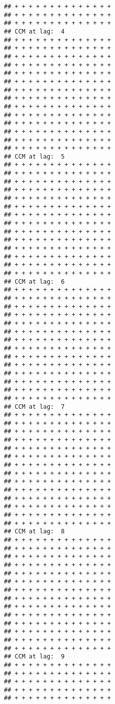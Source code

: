 \documentclass[
]{article}
\begin{document}
\begin{verbatim}
## + + + + + + + + + + + + + + 
## + + + + + + + + + + + + + + 
## + + + + + + + + + + + + + + 
## CCM at lag:  4 
## + + + + + + + + + + + + + + 
## + + + + + + + + + + + + + + 
## + + + + + + + + + + + + + + 
## + + + + + + + + + + + + + + 
## + + + + + + + + + + + + + + 
## + + + + + + + + + + + + + + 
## + + + + + + + + + + + + + + 
## + + + + + + + + + + + + + + 
## + + + + + + + + + + + + + + 
## + + + + + + + + + + + + + + 
## + + + + + + + + + + + + + + 
## + + + + + + + + + + + + + + 
## + + + + + + + + + + + + + + 
## + + + + + + + + + + + + + + 
## CCM at lag:  5 
## + + + + + + + + + + + + + + 
## + + + + + + + + + + + + + + 
## + + + + + + + + + + + + + + 
## + + + + + + + + + + + + + + 
## + + + + + + + + + + + + + + 
## + + + + + + + + + + + + + + 
## + + + + + + + + + + + + + + 
## + + + + + + + + + + + + + + 
## + + + + + + + + + + + + + + 
## + + + + + + + + + + + + + + 
## + + + + + + + + + + + + + + 
## + + + + + + + + + + + + + + 
## + + + + + + + + + + + + + + 
## + + + + + + + + + + + + + + 
## CCM at lag:  6 
## + + + + + + + + + + + + + + 
## + + + + + + + + + + + + + + 
## + + + + + + + + + + + + + + 
## + + + + + + + + + + + + + + 
## + + + + + + + + + + + + + + 
## + + + + + + + + + + + + + + 
## + + + + + + + + + + + + + + 
## + + + + + + + + + + + + + + 
## + + + + + + + + + + + + + + 
## + + + + + + + + + + + + + + 
## + + + + + + + + + + + + + + 
## + + + + + + + + + + + + + + 
## + + + + + + + + + + + + + + 
## + + + + + + + + + + + + + + 
## CCM at lag:  7 
## + + + + + + + + + + + + + + 
## + + + + + + + + + + + + + + 
## + + + + + + + + + + + + + + 
## + + + + + + + + + + + + + + 
## + + + + + + + + + + + + + + 
## + + + + + + + + + + + + + + 
## + + + + + + + + + + + + + + 
## + + + + + + + + + + + + + + 
## + + + + + + + + + + + + + + 
## + + + + + + + + + + + + + + 
## + + + + + + + + + + + + + + 
## + + + + + + + + + + + + + + 
## + + + + + + + + + + + + + + 
## + + + + + + + + + + + + + + 
## CCM at lag:  8 
## + + + + + + + + + + + + + + 
## + + + + + + + + + + + + + + 
## + + + + + + + + + + + + + + 
## + + + + + + + + + + + + + + 
## + + + + + + + + + + + + + + 
## + + + + + + + + + + + + + + 
## + + + + + + + + + + + + + + 
## + + + + + + + + + + + + + + 
## + + + + + + + + + + + + + + 
## + + + + + + + + + + + + + + 
## + + + + + + + + + + + + + + 
## + + + + + + + + + + + + + + 
## + + + + + + + + + + + + + + 
## + + + + + + + + + + + + + + 
## CCM at lag:  9 
## + + + + + + + + + + + + + + 
## + + + + + + + + + + + + + + 
## + + + + + + + + + + + + + + 
## + + + + + + + + + + + + + + 
## + + + + + + + + + + + + + + 

\end{verbatim}
\end{document}
